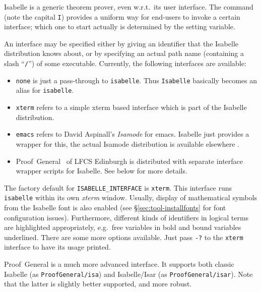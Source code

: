 Isabelle is a generic theorem prover, even w.r.t.\ its user interface.  The
 command (note the capital \texttt{I}) provides a uniform
way for end-users to invoke a certain interface; which one to start actually
is determined by the  setting variable.

An interface may be specified either by giving an identifier that the Isabelle
distribution knows about, or by specifying an actual path name (containing a
slash ``\texttt{/}'') of some executable.  Currently, the following interfaces
are available:

\begin{itemize}
\item \texttt{none} is just a pass-through to \texttt{isabelle}. Thus
  \texttt{Isabelle} basically becomes an alias for \texttt{isabelle}.
  
\item \texttt{xterm} refers to a simple xterm based interface which is part of
  the Isabelle distribution.
  
\item \texttt{emacs} refers to David Aspinall's \emph{Isamode} for emacs.  Isabelle just provides a wrapper for this,
  the actual Isamode distribution is available elsewhere \cite{isamode}.
  
\item Proof~General~\cite{proofgeneral} of
  LFCS Edinburgh is distributed with separate interface wrapper scripts for
  Isabelle.  See below for more details.
\end{itemize}

The factory default for \texttt{ISABELLE_INTERFACE} is \texttt{xterm}.  This
interface runs \texttt{isabelle} within its own \textsl{xterm} window.
Usually, display of mathematical symbols from the Isabelle font is also
enabled (see \S\ref{sec:tool-installfonts} for font configuration issues).
Furthermore, different kinds of identifiers in logical terms are highlighted
appropriately, e.g.\ free variables in bold and bound variables underlined.
There are some more options available.  Just pass \texttt{-?} to the
\texttt{xterm} interface to have its usage printed.

\medskip Proof~General is a much more
advanced interface.  It supports both classic Isabelle (as
\texttt{ProofGeneral/isa}) and Isabelle/Isar (as \texttt{ProofGeneral/isar}).
Note that the latter is slightly better supported, and more robust.

